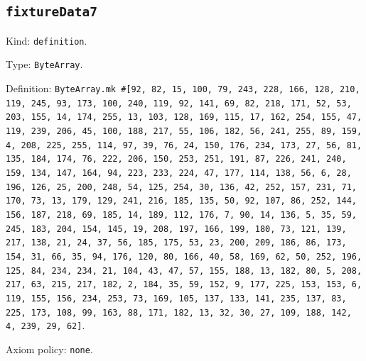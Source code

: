 \documentclass[11pt]{article}
\begin{document}
\subsection*{\texttt{fixtureData7}}
\noindent Kind: \texttt{definition}.\par
\noindent Type: \texttt{ByteArray}.\par
\noindent Definition: \texttt{ByteArray.mk \#[92, 82, 15, 100, 79, 243, 228, 166, 128, 210, 119, 245, 93, 173, 100, 240, 119, 92, 141, 69, 82, 218, 171, 52, 53, 203, 155, 14, 174, 255, 13, 103, 128, 169, 115, 17, 162, 254, 155, 47, 119, 239, 206, 45, 100, 188, 217, 55, 106, 182, 56, 241, 255, 89, 159, 4, 208, 225, 255, 114, 97, 39, 76, 24, 150, 176, 234, 173, 27, 56, 81, 135, 184, 174, 76, 222, 206, 150, 253, 251, 191, 87, 226, 241, 240, 159, 134, 147, 164, 94, 223, 233, 224, 47, 177, 114, 138, 56, 6, 28, 196, 126, 25, 200, 248, 54, 125, 254, 30, 136, 42, 252, 157, 231, 71, 170, 73, 13, 179, 129, 241, 216, 185, 135, 50, 92, 107, 86, 252, 144, 156, 187, 218, 69, 185, 14, 189, 112, 176, 7, 90, 14, 136, 5, 35, 59, 245, 183, 204, 154, 145, 19, 208, 197, 166, 199, 180, 73, 121, 139, 217, 138, 21, 24, 37, 56, 185, 175, 53, 23, 200, 209, 186, 86, 173, 154, 31, 66, 35, 94, 176, 120, 80, 166, 40, 58, 169, 62, 50, 252, 196, 125, 84, 234, 234, 21, 104, 43, 47, 57, 155, 188, 13, 182, 80, 5, 208, 217, 63, 215, 217, 182, 2, 184, 35, 59, 152, 9, 177, 225, 153, 153, 6, 119, 155, 156, 234, 253, 73, 169, 105, 137, 133, 141, 235, 137, 83, 225, 173, 108, 99, 163, 88, 171, 182, 13, 32, 30, 27, 109, 188, 142, 4, 239, 29, 62]}.\par
\noindent Axiom policy: \texttt{none}.\par
\end{document}
